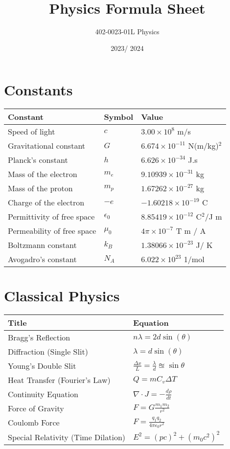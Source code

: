\documentclass[12pt,a4paper]{article}
\title{Physics Formula Sheet}
\author{402-0023-01L  Physics}
\date{2023/ 2024}
\begin{document}
	\maketitle
	
	\section*{Constants}
	\begin{tabular}{lll}
		\toprule
		Constant & Symbol & Value \\
		\midrule
		Speed of light & \( c \) & \( 3.00 \times 10^8 \) m/s \\
		Gravitational constant & \( G \) & \( 6.674 \times 10^{-11} \) N(m/kg)\(^2\) \\
		Planck's constant & \( h \) & \( 6.626 \times 10^{-34} \) J.s \\
		Mass of the electron & \(m_e\) & \(9.10939 \times 10^{-31}\) kg \\
		Mass of the proton & \(m_p\) & \(1.67262 \times 10^{-27}\) kg \\
		Charge of the electron & \(-e\) & \(-1.60218 \times 10^{-19}\) C \\
		Permittivity of free space & \(\epsilon_0\) & \(8.85419 \times 10^{-12}\) C\(^2\)/J m \\
		Permeability of free space & \(\mu_0\) & \( 4 \pi \times 10^{-7}\) T m / A \\
		Boltzmann constant & \(k_B\) & \(1.38066 \times 10^{-23}\) J/ K \\
		Avogadro's constant & \(N_A \) & \( 6.022 \times 10 ^ {23} \) 1/mol\\
		\bottomrule
	\end{tabular}
	
	\section*{Classical Physics}
	\begin{tabular}{ll}
		\toprule
		\textbf{Title} & \textbf{Equation} \\
		\midrule
		Bragg's Reflection & \( n \lambda = 2d \sin(\theta) \) \\
		Diffraction (Single Slit) & \( \lambda = d \sin(\theta) \) \\
		Young's Double Slit & \( \frac{\Delta x}{L} = \frac{ \lambda}{d} \approxeq \sin\theta\) \\
		Heat Transfer (Fourier's Law) & \( Q = mC_v \Delta T \) \\
		Continuity Equation & \( \nabla \cdot J = - \frac{d \rho}{dt} \) \\
		Force of Gravity & \( F = G \frac{m_1 m_2}{r^2} \) \\
		Coulomb Force & \( F =  \frac{q_1 q_2}{4 \pi \epsilon_0 r^2} \) \\
		Special Relativity (Time Dilation) & \( E^2 = (pc)^2 + (m_0 c^2)^2 \) \\
		\bottomrule
	\end{tabular}
	
\end{document}
